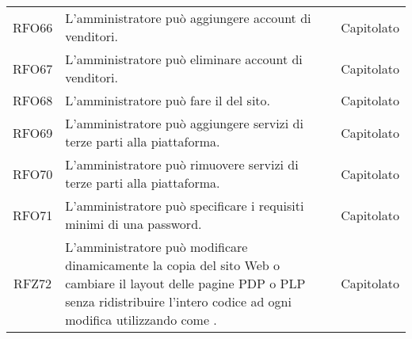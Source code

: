 \begin{longtable}{|c C{9.5cm} C{2.5cm}|}
    RFO66 & L'amministratore può aggiungere account di venditori. & Capitolato \\
    
    RFO67 & L'amministratore può eliminare account di venditori. & Capitolato \\
        
    RFO68 & L'amministratore può fare il  del sito. & Capitolato \\
    
    RFO69 & L'amministratore può aggiungere servizi di terze parti alla piattaforma. & Capitolato \\
    
    RFO70 & L'amministratore può rimuovere servizi di terze parti alla piattaforma. & Capitolato \\
    
    RFO71 & L'amministratore può specificare i requisiti minimi di una password. & Capitolato \\
    
    RFZ72 & L'amministratore può modificare dinamicamente la copia del sito Web o cambiare il layout delle pagine PDP o PLP senza ridistribuire l'intero codice ad ogni modifica utilizzando  come . & Capitolato \\

\end{longtable}
